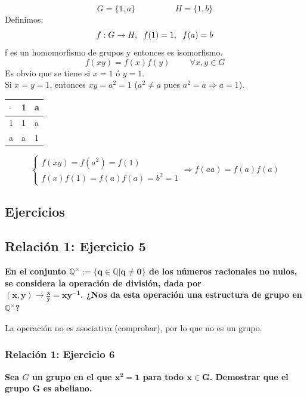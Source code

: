 \documentclass[11pt,a4paper]{article}
\begin{document}
$$G = \{1,a\} \hspace{2cm} H = \{1,b\}$$
Definimos:
$$f: G \to H, \hspace{0.2cm} f(1) = 1, \hspace{0.2cm} f(a) = b$$
f es un homomorfismo de grupos y entonces es isomorfismo.
$$f(xy) = f(x) f(y) \hspace{1cm} \forall x, y \in G$$
Es obvio que se tiene si $x=1$ ó $y=1$. \\
Si $x=y=1$, entonces $xy = a^{2} = 1$ ($a^{2} \neq a$ pues $a^{2} = a \Rightarrow a = 1$). 
\begin{table}[h!]
\begin{tabular}{l|ll}
$\cdot$ & 1 & a \\
\hline
1 & 1 & a \\
a & a & 1
\end{tabular}
\end{table}
\begin{equation*}
\begin{cases}
f(xy) = f(a^{2}) = f(1) \\
f(x)f(1) = f(a)f(a) = b^{2} = 1
\end{cases}
\Rightarrow f(aa) = f(a)f(a)
\end{equation*}

\subsection{Ejercicios}

\subsection*{Relación 1: Ejercicio 5}

\textbf{En el conjunto $\mathbf{\mathbb{Q}^{\times} := \{q \in \mathbb{Q} | q \neq 0\}}$ de los números racionales no nulos, se considera la operación de división, dada por \\ $\mathbf{(x, y) \to \frac{x}{y} = xy^{-1}}$. ¿Nos da esta operación una estructura de grupo en $\mathbb{Q}^{\times}$?}

La operación no es asociativa (comprobar), por lo que no es un grupo.

\subsubsection*{Relación 1: Ejercicio 6}

\textbf{Sea $G$ un grupo en el que $\mathbf{x^{2} = 1}$ para todo $\mathbf{x \in G}$. Demostrar que el grupo $\mathbf{G}$ es abeliano.}
\end{document}
